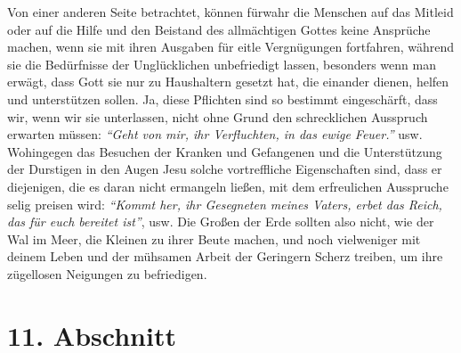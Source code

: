 Von einer anderen Seite
betrachtet, können fürwahr
die Menschen auf das Mitleid oder auf die Hilfe und
den Beistand des allmächtigen Gottes keine Ansprüche machen, wenn sie mit ihren
Ausgaben für eitle Vergnügungen fortfahren, während sie die Bedürfnisse der
Unglücklichen unbefriedigt lassen, besonders wenn man erwägt, dass Gott sie nur
zu Haushaltern gesetzt hat, die einander dienen, helfen und unterstützen sollen.
Ja, diese Pflichten sind so bestimmt eingeschärft, dass wir, wenn wir sie
unterlassen, nicht ohne Grund den schrecklichen Ausspruch erwarten müssen:
\textit{"`Geht von mir, ihr Verfluchten, in das ewige
Feuer."'} usw.
Wohingegen das Besuchen der Kranken und Gefangenen und die
Unterstützung der Durstigen in den Augen Jesu solche vortreffliche Eigenschaften
sind, dass er diejenigen, die es daran nicht ermangeln ließen, mit dem
erfreulichen Ausspruche selig preisen wird:
\textit{"`Kommt her, ihr Gesegneten meines
Vaters, erbet das Reich, das für euch bereitet ist"'}, usw. Die Großen der
Erde sollten also nicht, wie der Wal im Meer, die Kleinen zu ihrer Beute
machen, und noch vielweniger mit deinem Leben und der mühsamen Arbeit der
Geringern Scherz treiben, um ihre zügellosen Neigungen zu befriedigen.

\section{11. Abschnitt} \label{kap18_ab11}

